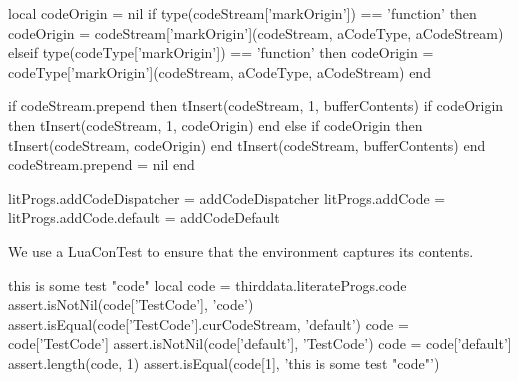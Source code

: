   local codeOrigin      = nil
    if type(codeStream['markOrigin']) == 'function' then
      codeOrigin =
        codeStream['markOrigin'](codeStream, aCodeType, aCodeStream)
    elseif type(codeType['markOrigin']) == 'function' then
      codeOrigin =
        codeType['markOrigin'](codeStream, aCodeType, aCodeStream)
    end

  if codeStream.prepend then
    tInsert(codeStream, 1, bufferContents)
    if codeOrigin then 
      tInsert(codeStream, 1, codeOrigin)
    end
  else
    if codeOrigin then
      tInsert(codeStream, codeOrigin)
    end
    tInsert(codeStream, bufferContents)
  end
  codeStream.prepend = nil
end

litProgs.addCodeDispatcher = addCodeDispatcher
litProgs.addCode           = {}
litProgs.addCode.default   = addCodeDefault
\stopLuaCode

\startMkIVCode
\unexpanded\def\setLitProgsOriginMarker{%
  \dotripleempty\doSetLitProgsOriginMarker%
}

\unexpanded{}
\stopMkIVCode


We use a LuaConTest to ensure that the  environment 
captures its contents. 

\startConTest
\begingroup
  \startTestCode
    this is some test "code"
  \stopTestCode
  \startLuaConTest
    local code = thirddata.literateProgs.code
    assert.isNotNil(code['TestCode'], 'code')
    assert.isEqual(code['TestCode'].curCodeStream, 'default')
    code = code['TestCode']
    assert.isNotNil(code['default'], 'TestCode')
    code = code['default']
    assert.length(code, 1)
    assert.isEqual(code[1], 'this is some test "code"')
  \stopLuaConTest
\endgroup
\stopConTest
\stopTestCase


